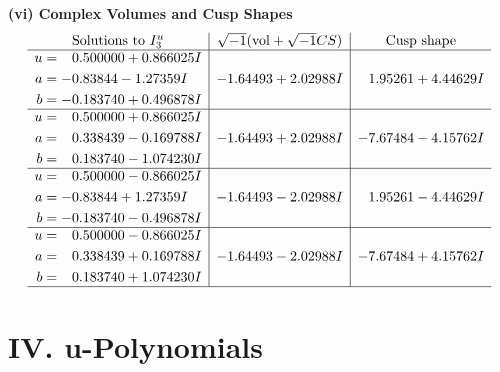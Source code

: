 \documentclass[1p]{elsarticle_modified}
\theoremstyle{definition}
\newcommand{\I}{\sqrt{-1}}
\begin{document}
\newpage\flushleft \textbf{(vi) Complex Volumes and Cusp Shapes}
$$\begin{array}{c|c|c}  
\text{Solutions to }I^u_{3}& \I (\text{vol} + \sqrt{-1}CS) & \text{Cusp shape}\\
 \hline 
\begin{aligned}
u &= \phantom{-}0.500000 + 0.866025 I \\
a &= -0.83844 - 1.27359 I \\
b &= -0.183740 + 0.496878 I\end{aligned}
 & -1.64493 + 2.02988 I & \phantom{-}1.95261 + 4.44629 I \\ \hline\begin{aligned}
u &= \phantom{-}0.500000 + 0.866025 I \\
a &= \phantom{-}0.338439 - 0.169788 I \\
b &= \phantom{-}0.183740 - 1.074230 I\end{aligned}
 & -1.64493 + 2.02988 I & -7.67484 - 4.15762 I \\ \hline\begin{aligned}
u &= \phantom{-}0.500000 - 0.866025 I \\
a &= -0.83844 + 1.27359 I \\
b &= -0.183740 - 0.496878 I\end{aligned}
 & -1.64493 - 2.02988 I & \phantom{-}1.95261 - 4.44629 I \\ \hline\begin{aligned}
u &= \phantom{-}0.500000 - 0.866025 I \\
a &= \phantom{-}0.338439 + 0.169788 I \\
b &= \phantom{-}0.183740 + 1.074230 I\end{aligned}
 & -1.64493 - 2.02988 I & -7.67484 + 4.15762 I\\
 \hline 
 \end{array}$$\newpage
\newpage\renewcommand{\arraystretch}{1}
\centering \section*{ IV. u-Polynomials}
\end{document}
